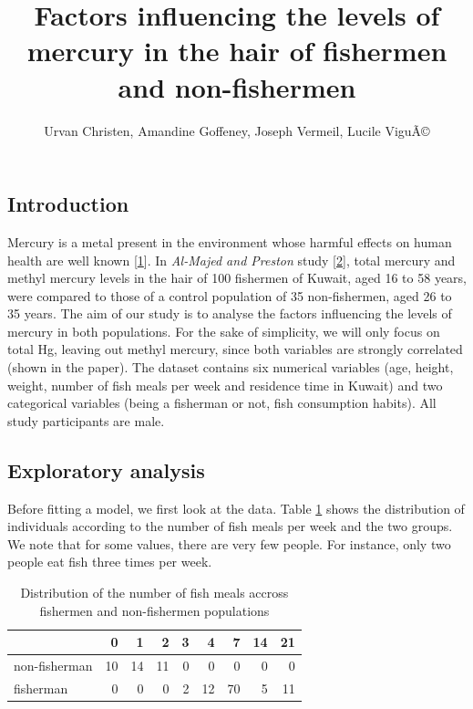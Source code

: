 \documentclass[12pt,]{article}
\title{Factors influencing the levels of mercury in the hair of fishermen and
non-fishermen}
\author{Urvan Christen, Amandine Goffeney, Joseph Vermeil, Lucile ViguÃ©}
\date{}
\begin{document}
\maketitle

\subsection{Introduction}\label{introduction}

Mercury is a metal present in the environment whose harmful effects on
human health are well known
{[}\protect\hyperlink{ref-park2012human}{1}{]}. In \emph{Al-Majed and
Preston} study {[}\protect\hyperlink{ref-al2000factors}{2}{]}, total
mercury and methyl mercury levels in the hair of 100 fishermen of
Kuwait, aged 16 to 58 years, were compared to those of a control
population of 35 non-fishermen, aged 26 to 35 years. The aim of our
study is to analyse the factors influencing the levels of mercury in
both populations. For the sake of simplicity, we will only focus on
total Hg, leaving out methyl mercury, since both variables are strongly
correlated (shown in the paper). The dataset contains six numerical
variables (age, height, weight, number of fish meals per week and
residence time in Kuwait) and two categorical variables (being a
fisherman or not, fish consumption habits). All study participants are
male.



\subsection{Exploratory analysis}\label{exploratory-analysis}

Before fitting a model, we first look at the data. Table
\ref{tbl:fishmlwk} shows the distribution of individuals according to
the number of fish meals per week and the two groups. We note that for
some values, there are very few people. For instance, only two people
eat fish three times per week. 

\begin{table}[H]
\caption{\label{tab:unnamed-chunk-6}\label{tbl:fishmlwk}Distribution of the number of fish meals accross fishermen and non-fishermen populations}
\centering
\begin{tabular}{lrrrrrrrr}
\toprule
  & 0 & 1 & 2 & 3 & 4 & 7 & 14 & 21\\
\midrule
\rowcolor{gray!6}  non-fisherman & 10 & 14 & 11 & 0 & 0 & 0 & 0 & 0\\
fisherman & 0 & 0 & 0 & 2 & 12 & 70 & 5 & 11\\
\bottomrule
\end{tabular}
\end{table}
\end{document}
